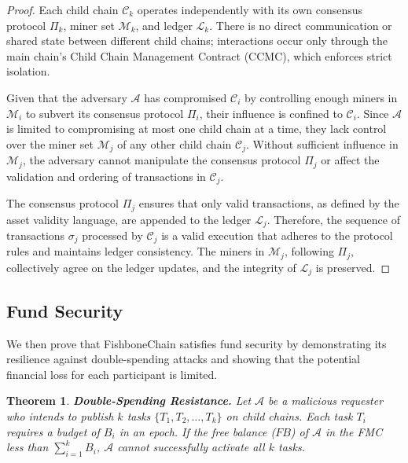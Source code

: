 \documentclass[10pt,journal]{IEEEtran}
\newtheorem{theorem}{Theorem}
\begin{document}
\begin{proof}
Each child chain $\mathcal{C}_k$ operates independently with its own consensus protocol $\Pi_k$, miner set $\mathcal{M}_k$, and ledger $\mathcal{L}_k$. There is no direct communication or shared state between different child chains; interactions occur only through the main chain's Child Chain Management Contract (CCMC), which enforces strict isolation.

Given that the adversary $\mathcal{A}$ has compromised $\mathcal{C}_i$ by controlling enough miners in $\mathcal{M}_i$ to subvert its consensus protocol $\Pi_i$, their influence is confined to $\mathcal{C}_i$. Since $\mathcal{A}$ is limited to compromising at most one child chain at a time, they lack control over the miner set $\mathcal{M}_j$ of any other child chain $\mathcal{C}_j$. Without sufficient influence in $\mathcal{M}_j$, the adversary cannot manipulate the consensus protocol $\Pi_j$ or affect the validation and ordering of transactions in $\mathcal{C}_j$.

The consensus protocol $\Pi_j$ ensures that only valid transactions, as defined by the asset validity language, are appended to the ledger $\mathcal{L}_j$. Therefore, the sequence of transactions $\sigma_j$ processed by $\mathcal{C}_j$ is a valid execution that adheres to the protocol rules and maintains ledger consistency. The miners in $\mathcal{M}_j$, following $\Pi_j$, collectively agree on the ledger updates, and the integrity of $\mathcal{L}_j$ is preserved.
\end{proof}

\subsection{Fund Security}
We then prove that FishboneChain satisfies fund security by demonstrating its resilience against double-spending attacks and showing that the potential financial loss for each participant is limited.

\begin{theorem}\label{thm_anti_double_spending}
    \textbf{Double-Spending Resistance.} Let $\mathcal{A}$ be a malicious requester who intends to publish $k$ tasks $\{T_1, T_2, \dots, T_k\}$ on child chains.  Each task $T_i$ requires a budget of $B_i$ in an epoch. If the free balance ($FB$) of $\mathcal{A}$ in the FMC less than $\sum_{i=1}^k B_i$, $\mathcal{A}$ cannot successfully activate all $k$ tasks. 
\end{theorem}
\end{document}
